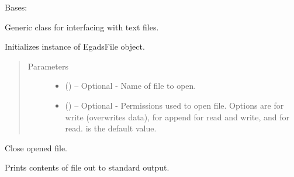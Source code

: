 \documentclass[a4paper,10pt,openany,english]{sphinxmanual}
\begin{document}
\label{egadsapi:module-egads.input.text_file_io}

\begin{fulllineitems}
\label{egadsapi:egads.input.text_file_io.EgadsFile}
Bases: {\hyperref[egadsapi:egads.input.input_core.FileCore]{}}

Generic class for interfacing with text files.

Initializes instance of EgadsFile object.
\begin{quote}\begin{description}
\item[{Parameters}] \leavevmode\begin{itemize}
\item {} 
 () -- Optional - Name of file to open.

\item {} 
 () -- Optional - Permissions used to open file. Options are  for write (overwrites
data),  for append  for read and write, and  for read.  is the 
default value.

\end{itemize}

\end{description}\end{quote}

\begin{fulllineitems}
\label{egadsapi:egads.input.text_file_io.EgadsFile.close}
Close opened file.

\end{fulllineitems}


\begin{fulllineitems}
\label{egadsapi:egads.input.text_file_io.EgadsFile.display_file}
Prints contents of file out to standard output.


\end{fulllineitems}
\end{fulllineitems}
\end{document}
